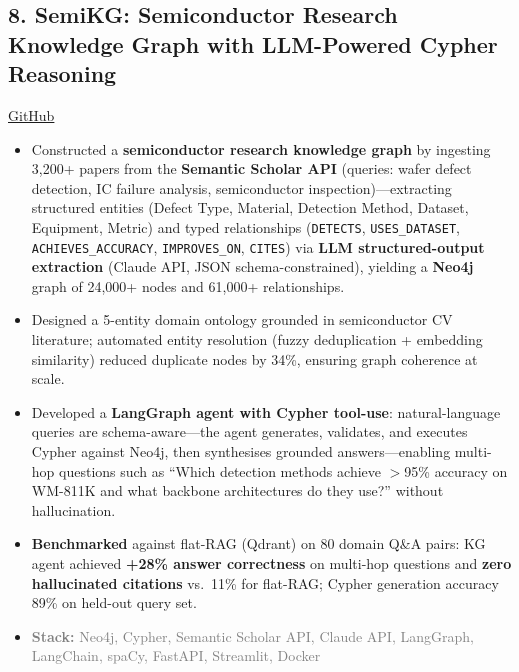 \documentclass[11pt,a4paper]{article}
\newcommand{\projectstack}[1]{\textcolor{graytext}{\textbf{Stack:} #1}}
\begin{document}
\subsection{8. SemiKG: Semiconductor Research Knowledge Graph with LLM-Powered Cypher Reasoning}
{\small \href{https://github.com/Shivamckaushik/SemiKG}{GitHub}}
\begin{itemize}[leftmargin=*, nosep, topsep=3pt]
    \item Constructed a \textbf{semiconductor research knowledge graph} by ingesting 3,200+ papers from the \textbf{Semantic Scholar API} (queries: wafer defect detection, IC failure analysis, semiconductor inspection)---extracting structured entities (Defect Type, Material, Detection Method, Dataset, Equipment, Metric) and typed relationships (\texttt{DETECTS}, \texttt{USES\_DATASET}, \texttt{ACHIEVES\_ACCURACY}, \texttt{IMPROVES\_ON}, \texttt{CITES}) via \textbf{LLM structured-output extraction} (Claude API, JSON schema-constrained), yielding a \textbf{Neo4j} graph of 24,000+ nodes and 61,000+ relationships.
    \item Designed a 5-entity domain ontology grounded in semiconductor CV literature; automated entity resolution (fuzzy deduplication + embedding similarity) reduced duplicate nodes by 34\%, ensuring graph coherence at scale.
    \item Developed a \textbf{LangGraph agent with Cypher tool-use}: natural-language queries are schema-aware---the agent generates, validates, and executes Cypher against Neo4j, then synthesises grounded answers---enabling multi-hop questions such as ``Which detection methods achieve $>$95\% accuracy on WM-811K and what backbone architectures do they use?'' without hallucination.
    \item \textbf{Benchmarked} against flat-RAG (Qdrant) on 80 domain Q\&A pairs: KG agent achieved \textbf{+28\% answer correctness} on multi-hop questions and \textbf{zero hallucinated citations} vs.\ 11\% for flat-RAG; Cypher generation accuracy 89\% on held-out query set.
    \item \projectstack{Neo4j, Cypher, Semantic Scholar API, Claude API, LangGraph, LangChain, spaCy, FastAPI, Streamlit, Docker}
\end{itemize}
\end{document}
